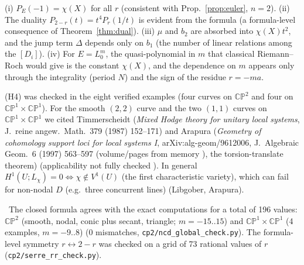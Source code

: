 \begin{rem}[Properties\ \tP]
(i) $P_E(-1)=\chi(X)$ for all $r$ (consistent with Prop.~\ref{prop:euler}, $n=2$). (ii) The duality $P_{2-r}(t)=t^4P_r(1/t)$ is evident from the formula (a formula-level consequence of Theorem~\ref{thm:dual}). (iii) $\mu$ and $b_2$ are absorbed into $\chi(X)t^2$, and the jump term $\Delta$ depends only on $b_1$ (the number of linear relations among the $[D_i]$). (iv) For $E=L_0^m$, the quasi-polynomial in $m$ that classical Riemann--Roch would give is the constant $\chi(X)$, and the dependence on $m$ appears only through the integrality (period $N$) and the sign of the residue $r=-ma$.
\end{rem}
\begin{rem}[\tQ\ On G2]
(H4) was checked in the eight verified examples (four curves on $\mathbb{CP}^2$ and four on $\mathbb{CP}^1\times\mathbb{CP}^1$). For the smooth $(2,2)$ curve and the two $(1,1)$ curves on $\mathbb{CP}^1\times\mathbb{CP}^1$ we cited Timmerscheidt (\emph{Mixed Hodge theory for unitary local systems}, J.\ reine angew.\ Math.\ 379 (1987) 152--171) and Arapura (\emph{Geometry of cohomology support loci for local systems I}, arXiv:alg-geom/9612006, J.\ Algebraic Geom.\ 6 (1997) 563--597 (volume/pages from memory \tQ), the torsion-translate theorem) (applicability not fully checked \tQ). In general $H^1(U;L_\chi)=0\Leftrightarrow\chi\notin V^1(U)$ (the first characteristic variety), which can fail for non-nodal $D$ (e.g.\ three concurrent lines) (Libgober, Arapura).
\end{rem}
\tV\ The closed formula agrees with the exact computations for a total of 196 values: $\mathbb{CP}^2$ (smooth, nodal, conic plus secant, triangle; $m=-15..15$) and $\mathbb{CP}^1\times\mathbb{CP}^1$ (4 examples, $m=-9..8$) (0 mismatches, \texttt{cp2/ncd\_global\_check.py}). The formula-level symmetry $r\leftrightarrow2-r$ was checked on a grid of 73 rational values of $r$ (\texttt{cp2/serre\_rr\_check.py}).

